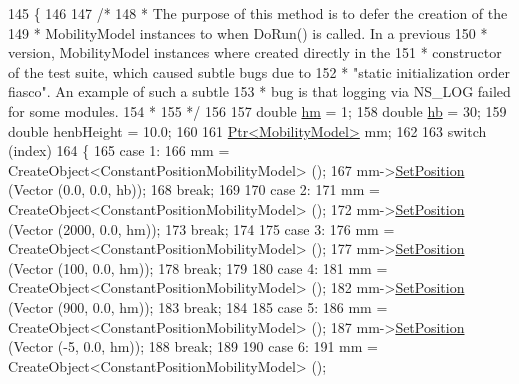 \begin{DoxyCode}
145 \{
146 
147   \textcolor{comment}{/*}
148 \textcolor{comment}{   * The purpose of this method is to defer the creation of the}
149 \textcolor{comment}{   * MobilityModel instances to when DoRun() is called. In a previous}
150 \textcolor{comment}{   * version, MobilityModel instances where created directly in the}
151 \textcolor{comment}{   * constructor of the test suite, which caused subtle bugs due to}
152 \textcolor{comment}{   * "static initialization order fiasco". An example of such a subtle}
153 \textcolor{comment}{   * bug is that logging via NS\_LOG failed for some modules.}
154 \textcolor{comment}{   * }
155 \textcolor{comment}{   */}
156 
157   \textcolor{keywordtype}{double} \hyperlink{buildings__pathloss_8m_adf48bfd0f3afa8972e753a0f895b0a51}{hm} = 1;
158   \textcolor{keywordtype}{double} \hyperlink{buildings__pathloss_8m_a2893d16f4bf2bcf4555002c045e565b9}{hb} = 30;
159   \textcolor{keywordtype}{double} henbHeight = 10.0;
160 
161   \hyperlink{classns3_1_1Ptr}{Ptr<MobilityModel>} mm;
162   
163   \textcolor{keywordflow}{switch} (index)
164     \{
165     \textcolor{keywordflow}{case} 1:
166       mm = CreateObject<ConstantPositionMobilityModel> ();
167       mm->\hyperlink{classns3_1_1MobilityModel_ac584b3d5a309709d2f13ed6ada1e7640}{SetPosition} (Vector (0.0, 0.0, hb));
168       \textcolor{keywordflow}{break};
169 
170     \textcolor{keywordflow}{case} 2:
171       mm = CreateObject<ConstantPositionMobilityModel> ();
172       mm->\hyperlink{classns3_1_1MobilityModel_ac584b3d5a309709d2f13ed6ada1e7640}{SetPosition} (Vector (2000, 0.0, hm));
173       \textcolor{keywordflow}{break};
174 
175     \textcolor{keywordflow}{case} 3:
176       mm = CreateObject<ConstantPositionMobilityModel> ();
177       mm->\hyperlink{classns3_1_1MobilityModel_ac584b3d5a309709d2f13ed6ada1e7640}{SetPosition} (Vector (100, 0.0, hm));
178       \textcolor{keywordflow}{break};
179 
180     \textcolor{keywordflow}{case} 4:
181       mm = CreateObject<ConstantPositionMobilityModel> ();
182       mm->\hyperlink{classns3_1_1MobilityModel_ac584b3d5a309709d2f13ed6ada1e7640}{SetPosition} (Vector (900, 0.0, hm));
183       \textcolor{keywordflow}{break};
184 
185     \textcolor{keywordflow}{case} 5:
186       mm = CreateObject<ConstantPositionMobilityModel> ();
187       mm->\hyperlink{classns3_1_1MobilityModel_ac584b3d5a309709d2f13ed6ada1e7640}{SetPosition} (Vector (-5, 0.0, hm));
188       \textcolor{keywordflow}{break};
189 
190     \textcolor{keywordflow}{case} 6:
191       mm = CreateObject<ConstantPositionMobilityModel> ();

\end{DoxyCode}
